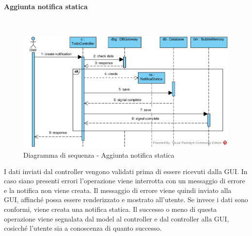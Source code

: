 \begin{samepage}
	\paragraph{Aggiunta notifica statica}\mbox{}\\
\end{samepage}
\begin{figure}[H]
	\centering
	\includegraphics[width=15cm]{../../documenti/SpecificaTecnica/diagrammi/sequenza/todo_aggiungi_notifica.png}
	\caption{Diagramma di sequenza - Aggiunta notifica statica}
\end{figure}
I dati inviati dal controller vengono validati prima di essere ricevuti dalla GUI. In caso siano presenti errori l'operazione viene interrotta con un messaggio di errore e la notifica non viene creata. Il messaggio di errore viene quindi inviato alla GUI, affinché possa essere renderizzato e mostrato all'utente. Se invece i dati sono conformi, viene creata una notifica statica. Il successo o meno di questa operazione viene segnalata dal model al controller e dal controller alla GUI, cosicché l'utente sia a conoscenza di quanto successo.

